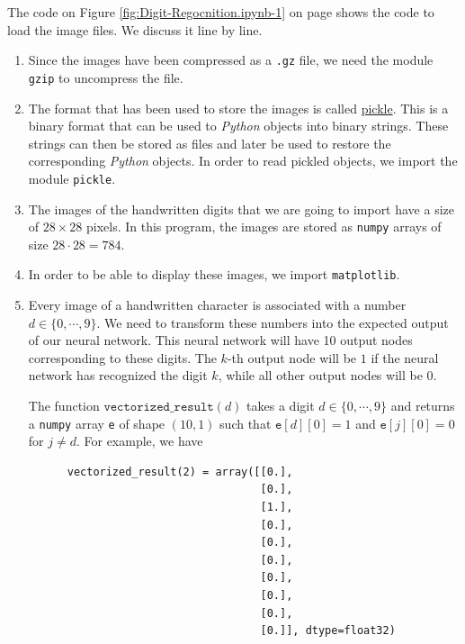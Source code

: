 The code on Figure \ref{fig:Digit-Regocnition.ipynb-1} on page \pageref{fig:Digit-Regocnition.ipynb-1} shows the
code to load the image files.  We discuss it line by line.
\begin{enumerate}
\item Since the images have been compressed as a \texttt{.gz} file, we need the module \texttt{gzip} to
      uncompress the file.
\item The format that has been used to store the images is called
      \href{https://docs.python.org/3.6/library/pickle.html}{pickle}.
      This is a binary format that can be used to  \textsl{Python} objects into binary strings.  These
      strings can then be stored as files and later be used to restore the corresponding \textsl{Python} objects.  In order
      to read pickled objects, we import the module \texttt{pickle}.
\item The images of the handwritten digits that we are going to import have a size of $28 \times 28$ pixels.
      In this program, the images are stored as \texttt{numpy} arrays of size $28 \cdot 28 = 784$.
\item In order to be able to display these images, we import \texttt{matplotlib}.
\item Every image of a handwritten character is associated with a number $d \in \{0, \cdots, 9\}$.
      We need to transform these numbers into the expected output of our neural network.  This neural network
      will have 10 output nodes corresponding to these digits.  The $k$-th output node will be $1$
      if the neural network has recognized the digit $k$, while all other output nodes will be $0$.

      The function $\texttt{vectorized\_result}(d)$ takes a digit $d \in \{0,\cdots,9\}$ and returns a
      \texttt{numpy} array \texttt{e} of shape $(10, 1)$ such that $\texttt{e}[d][0]=1$ and $\texttt{e}[j][0]=0$ for
      $j\not=d$.  For example, we have
      \begin{verbatim}
      vectorized_result(2) = array([[0.],
                                    [0.],
                                    [1.],
                                    [0.],
                                    [0.],
                                    [0.],
                                    [0.],
                                    [0.],
                                    [0.],
                                    [0.]], dtype=float32)
      \end{verbatim} %
      \vspace*{-0.5cm}
      

\end{enumerate}
